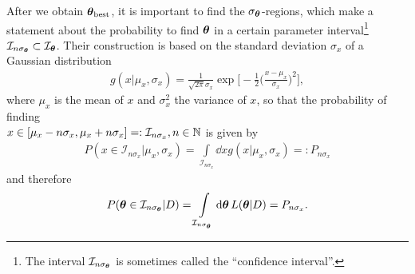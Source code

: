 \noindent After we obtain $\vb*{\theta}_{\text{best}}$, it is important to find the $\sigma_{\vb*{\theta}}$-regions, which make a statement about the probability to find $\vb*{\theta}$ in a certain parameter interval\footnote{The interval $\mathcal{I}_{n \sigma_{\vb*{\theta}}}$ is sometimes called the ``confidence interval''.}  $\mathcal{I}_{n\sigma_{\vb*{\theta}}} \subset \mathcal{I}_{\vb*{\theta}}$. Their construction is based on the standard deviation $\sigma_{x}$ of a Gaussian distribution
\begin{align}
    g(x \vert \mu_{x}, \sigma_{x}) = \frac{1}{\sqrt{2\pi} \sigma_{x}} \exp \biggl[- \frac{1}{2} \biggl(\frac{x - \mu_{x}}{\sigma_{x}} \biggr)^2 \biggr], \label{eq:gauss-distribution} 
\end{align}
where $\mu_{x}$ is the mean of $x$ and $\sigma_{x}^2$ the variance of $x$, so that the probability of finding \\ 
${x \in[\mu_{x} - n\sigma_{x}, \mu_{x} + n \sigma_{x}] =: \mathcal{I}_{n\sigma_{x}}, n \in \mathbb{N}}$ is given by
\begin{align}
    P(x \in \mathcal{I}_{n\sigma_{x}} \vert \mu_{x}, \sigma_{x}) = \int\limits_{\mathcal{I}_{n\sigma_{x}}} \dd{x} g(x \vert \mu_{x}, \sigma_{x}) =: P_{n\sigma_{x}}
\end{align}
and therefore
\begin{align}
    P(\vb*{\theta} \in \mathcal{I}_{n \sigma_{\vb*{\theta}}} \vert D) = \int\limits_{\mathcal{I}_{n \sigma_{\vb*{\theta}}}} \dd{\vb*{\theta}} L(\vb*{\theta} \vert D) = P_{n \sigma_{x}}.  
\end{align}

